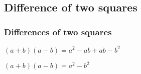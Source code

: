 \subsection{Difference of two squares}

\subsubsection{Differences of two squares}

$(a+b)(a-b)=a^2-ab+ab-b^2$

$(a+b)(a-b)=a^2-b^2$

